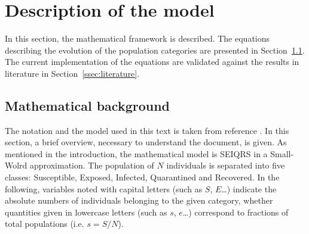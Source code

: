 
\section{Description of the model}
\label{sec:model}

In this section, the mathematical framework is described. The equations describing the evolution of the population categories are presented in Section~\ref{ssec:math}. The current implementation of the equations are validated against the results in literature in Section~\ref{ssec:literature}.

\subsection{Mathematical background}
\label{ssec:math}
The notation and the model used in this text is taken from reference \cite{MingLiu}. In this section, a brief overview, necessary to understand the document, is given. As mentioned in the introduction, the mathematical model is SEIQRS in a Small-Wolrd approximation. The population of $N$ individuals is separated into five classes: Susceptible, Exposed, Infected, Quarantined and Recovered. In the following, variables noted with capital letters (such as $S$, $E$\dots) indicate the absolute numbers of individuals belonging to the given category, whether quantities given in lowercase letters (such as $s$, $e$\dots) correspond to fractions of total populations (i.e. $s = S/N$). \\

